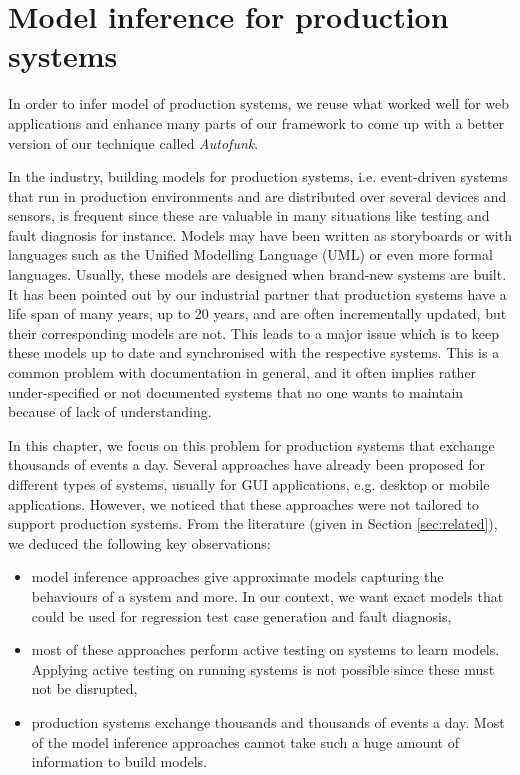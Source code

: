 %
\chapter{Model inference for production systems}
\label{sec:modelinf:prodsystems}

In order to infer model of production systems, we reuse what
worked well for web applications and enhance many parts of our
framework to come up with a better version of our technique
called \textit{Autofunk}.

In the industry, building models for production systems, i.e.
event-driven systems that run in production environments and are
distributed over several devices and sensors, is frequent since
these are valuable in many situations like testing and fault
diagnosis for instance. Models may have been written as
storyboards or with languages such as the Unified Modelling
Language (UML) or even more formal languages. Usually, these
models are designed when brand-new systems are built. It has been
pointed out by our industrial partner that production systems
have a life span of many years, up to 20 years, and are often
incrementally updated, but their corresponding models are not.
This leads to a major issue which is to keep these models up to
date and synchronised with the respective systems. This is a
common problem with documentation in general, and it often
implies rather under-specified or not documented systems that no
one wants to maintain because of lack of understanding.

In this chapter, we focus on this problem for production systems
that exchange thousands of events a day. Several approaches have
already been proposed for different types of systems, usually for
GUI applications, e.g. desktop or mobile applications. However,
we noticed that these approaches were not tailored to support
production systems. From the literature (given in Section
\ref{sec:related}), we deduced the following key observations:

\begin{itemize}
    \item model inference approaches give approximate models
    capturing the behaviours of a system and more. In our
    context, we want exact models that could be used for
    regression test case generation and fault diagnosis,

    \item most of these approaches perform active testing on
    systems to learn models. Applying active testing on running
    systems is not possible since these must not be disrupted,

    \item production systems exchange thousands and thousands of
    events a day. Most of the model inference approaches cannot
    take such a huge amount of information to build models.
\end{itemize}

